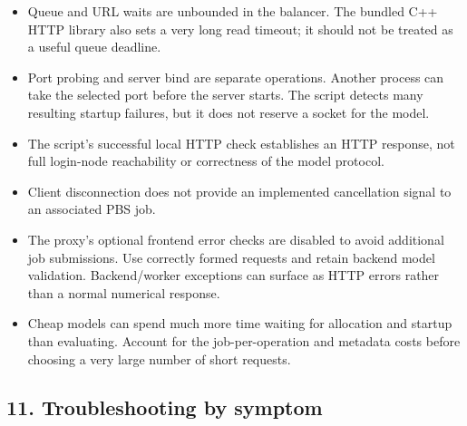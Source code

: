 \documentclass[
  11pt,
  a4paper,
]{article}
\providecommand{\tightlist}{%
  \setlength{\itemsep}{0pt}\setlength{\parskip}{0pt}}
\begin{document}
\begin{itemize}
\tightlist
\item
  Queue and URL waits are unbounded in the balancer. The bundled C++
  HTTP library also sets a very long read timeout; it should not be
  treated as a useful queue deadline.
\item
  Port probing and server bind are separate operations. Another process
  can take the selected port before the server starts. The script
  detects many resulting startup failures, but it does not reserve a
  socket for the model.
\item
  The script's successful local HTTP check establishes an HTTP response,
  not full login-node reachability or correctness of the model protocol.
\item
  Client disconnection does not provide an implemented cancellation
  signal to an associated PBS job.
\item
  The proxy's optional frontend error checks are disabled to avoid
  additional job submissions. Use correctly formed requests and retain
  backend model validation. Backend/worker exceptions can surface as
  HTTP errors rather than a normal numerical response.
\item
  Cheap models can spend much more time waiting for allocation and
  startup than evaluating. Account for the job-per-operation and
  metadata costs before choosing a very large number of short requests.
\end{itemize}

\hypertarget{troubleshooting-by-symptom}{%
\subsection{11. Troubleshooting by
symptom}\label{troubleshooting-by-symptom}}
\end{document}
